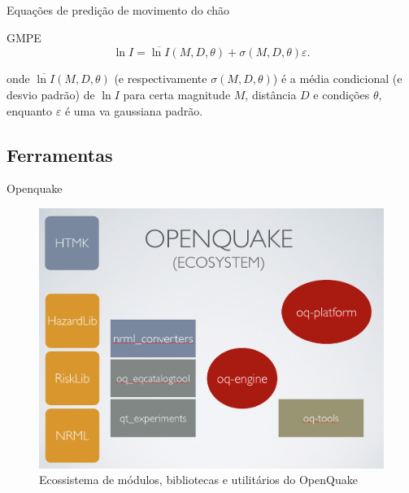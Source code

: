 \documentclass[ucs,8pt]{beamer}
\begin{document}
\begin{frame}{Equações de predição de movimento do chão}	
	\begin{block}{GMPE}
		\begin{equation} \label{pgamodel}
		\ln I = \overline{\ln I}(M, D, \theta) + \sigma(M, D, \theta) \varepsilon.
		\end{equation}
	\end{block}
	onde $\overline{\ln I}(M, D, \theta)$ (e respectivamente $\sigma(M, D,
	\theta)$) é a média condicional (e desvio padrão) de $\ln I$ para certa magnitude $M$, distância $D$
	e condições $\theta$, enquanto $\varepsilon$ é uma \gls{va} gaussiana padrão.
\end{frame}




\subsection{Ferramentas}
\begin{frame}{Openquake}
\begin{figure}[!h]
  \centering
  \includegraphics[height=.90\textheight]{oq_ecosystem} 
  \caption{Ecossistema de módulos, bibliotecas e utilitários do OpenQuake}
  \label{fig:oq} 
\end{figure}
\end{frame}
\end{document}
